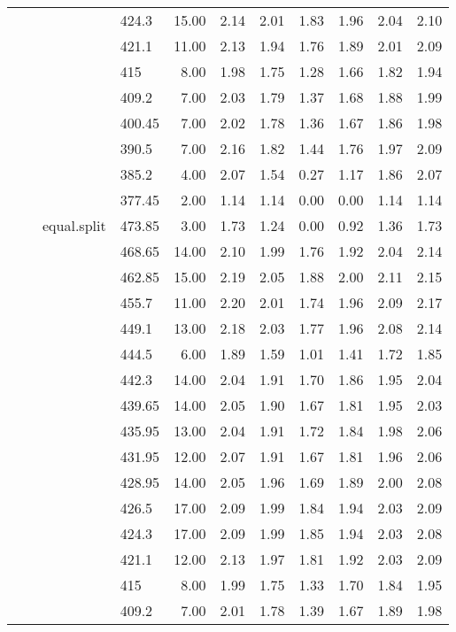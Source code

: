 \begin{longtable}{llllrrrrrrr}
   &  &  & 424.3 & 15.00 & 2.14 & 2.01 & 1.83 & 1.96 & 2.04 & 2.10 \\ 
   &  &  & 421.1 & 11.00 & 2.13 & 1.94 & 1.76 & 1.89 & 2.01 & 2.09 \\ 
   &  &  & 415 & 8.00 & 1.98 & 1.75 & 1.28 & 1.66 & 1.82 & 1.94 \\ 
   &  &  & 409.2 & 7.00 & 2.03 & 1.79 & 1.37 & 1.68 & 1.88 & 1.99 \\ 
   &  &  & 400.45 & 7.00 & 2.02 & 1.78 & 1.36 & 1.67 & 1.86 & 1.98 \\ 
   &  &  & 390.5 & 7.00 & 2.16 & 1.82 & 1.44 & 1.76 & 1.97 & 2.09 \\ 
   &  &  & 385.2 & 4.00 & 2.07 & 1.54 & 0.27 & 1.17 & 1.86 & 2.07 \\ 
   &  &  & 377.45 & 2.00 & 1.14 & 1.14 & 0.00 & 0.00 & 1.14 & 1.14 \\ 
   &  & equal.split & 473.85 & 3.00 & 1.73 & 1.24 & 0.00 & 0.92 & 1.36 & 1.73 \\ 
   &  &  & 468.65 & 14.00 & 2.10 & 1.99 & 1.76 & 1.92 & 2.04 & 2.14 \\ 
   &  &  & 462.85 & 15.00 & 2.19 & 2.05 & 1.88 & 2.00 & 2.11 & 2.15 \\ 
   &  &  & 455.7 & 11.00 & 2.20 & 2.01 & 1.74 & 1.96 & 2.09 & 2.17 \\ 
   &  &  & 449.1 & 13.00 & 2.18 & 2.03 & 1.77 & 1.96 & 2.08 & 2.14 \\ 
   &  &  & 444.5 & 6.00 & 1.89 & 1.59 & 1.01 & 1.41 & 1.72 & 1.85 \\ 
   &  &  & 442.3 & 14.00 & 2.04 & 1.91 & 1.70 & 1.86 & 1.95 & 2.04 \\ 
   &  &  & 439.65 & 14.00 & 2.05 & 1.90 & 1.67 & 1.81 & 1.95 & 2.03 \\ 
   &  &  & 435.95 & 13.00 & 2.04 & 1.91 & 1.72 & 1.84 & 1.98 & 2.06 \\ 
   &  &  & 431.95 & 12.00 & 2.07 & 1.91 & 1.67 & 1.81 & 1.96 & 2.06 \\ 
   &  &  & 428.95 & 14.00 & 2.05 & 1.96 & 1.69 & 1.89 & 2.00 & 2.08 \\ 
   &  &  & 426.5 & 17.00 & 2.09 & 1.99 & 1.84 & 1.94 & 2.03 & 2.09 \\ 
   &  &  & 424.3 & 17.00 & 2.09 & 1.99 & 1.85 & 1.94 & 2.03 & 2.08 \\ 
   &  &  & 421.1 & 12.00 & 2.13 & 1.97 & 1.81 & 1.92 & 2.03 & 2.09 \\ 
   &  &  & 415 & 8.00 & 1.99 & 1.75 & 1.33 & 1.70 & 1.84 & 1.95 \\ 
   &  &  & 409.2 & 7.00 & 2.01 & 1.78 & 1.39 & 1.67 & 1.89 & 1.98 \\ 

\end{longtable}
